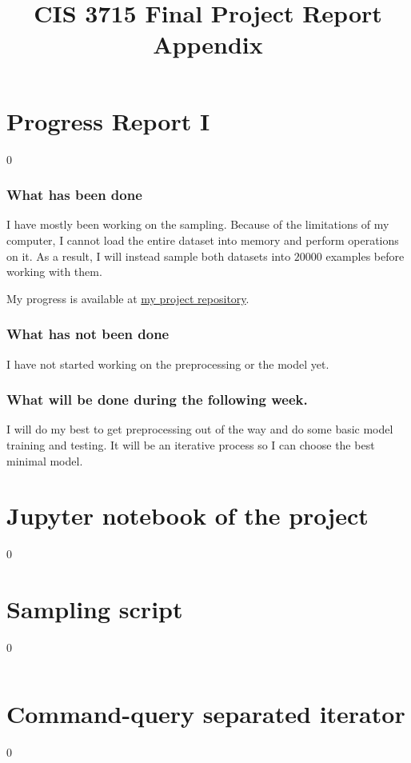 \documentclass[11pt]{report}
\let\oldpart\part%
\renewcommand*\part[1]{\oldpart{#1}\setcounter{section}0}%
\begin{document}
\part{Progress Report I}

\section{What has been done}

I have mostly been working on the sampling.
Because of the limitations of my computer,
I cannot load the entire dataset into memory and perform operations on it.
As a result,
I will instead sample both datasets into \(\num{20000}\) examples
before working with them.

My progress is available at \href{https://github.com/lduran2/CIS3715_DataScience_2022/tree/final/final}{my project repository}.

\section{What has not been done}

I have not started working on the preprocessing or the model yet.

\section{What will be done during the following week.}

I will do my best to get preprocessing out of the way and do some basic model training and testing.
It will be an iterative process
so I can choose the best minimal model.

\newpage
\appendix
\title{CIS 3715 Final Project Report Appendix}

\maketitle

\part{Jupyter notebook of the project}
\graphicspath{{ipynb/}}


\part{Sampling script}
\inputminted{python}{src/sample_dataset.py}

\part{Command-query separated iterator}
\inputminted{python}{src/cqs_iter.py}
\end{document}
